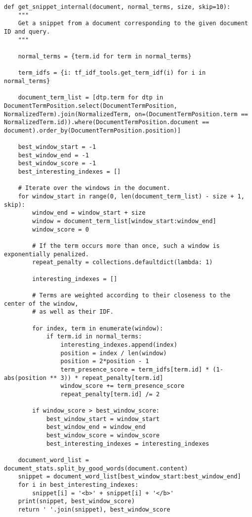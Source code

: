 \documentclass[a4page]{article}
\begin{document}
\begin{verbatim}
def get_snippet_internal(document, normal_terms, size, skip=10):
    """
    Get a snippet from a document corresponding to the given document ID and query.
    """

    normal_terms = {term.id for term in normal_terms}

    term_idfs = {i: tf_idf_tools.get_term_idf(i) for i in normal_terms}

    document_term_list = [dtp.term for dtp in DocumentTermPosition.select(DocumentTermPosition, NormalizedTerm).join(NormalizedTerm, on=(DocumentTermPosition.term == NormalizedTerm.id)).where(DocumentTermPosition.document == document).order_by(DocumentTermPosition.position)]

    best_window_start = -1
    best_window_end = -1
    best_window_score = -1
    best_interesting_indexes = []

    # Iterate over the windows in the document.
    for window_start in range(0, len(document_term_list) - size + 1, skip):
        window_end = window_start + size
        window = document_term_list[window_start:window_end]
        window_score = 0

        # If the term occurs more than once, such a window is exponentially penalized.
        repeat_penalty = collections.defaultdict(lambda: 1)

        interesting_indexes = []

        # Terms are weighted according to their closeness to the center of the window,
        # as well as their IDF.

        for index, term in enumerate(window):
            if term.id in normal_terms:
                interesting_indexes.append(index)
                position = index / len(window)
                position = 2*position - 1
                term_presence_score = term_idfs[term.id] * (1-abs(position ** 3)) * repeat_penalty[term.id]
                window_score += term_presence_score
                repeat_penalty[term.id] /= 2
        
        if window_score > best_window_score:
            best_window_start = window_start
            best_window_end = window_end
            best_window_score = window_score
            best_interesting_indexes = interesting_indexes
    
    document_word_list = document_stats.split_by_good_words(document.content)
    snippet = document_word_list[best_window_start:best_window_end]
    for i in best_interesting_indexes:
        snippet[i] = '<b>' + snippet[i] + '</b>'
    print(snippet, best_window_score)
    return ' '.join(snippet), best_window_score
\end{verbatim} 
\end{document}
